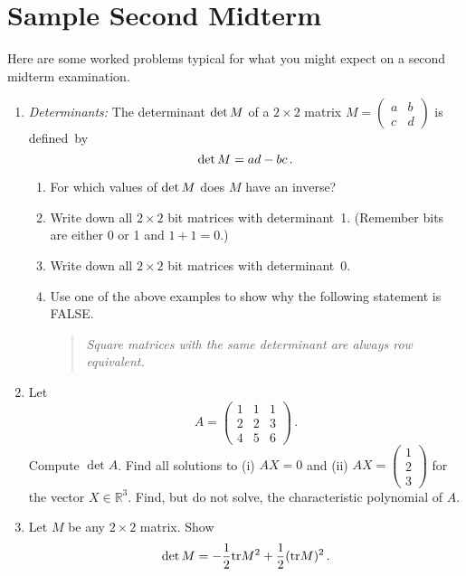 \chapter{Sample Second Midterm}

Here are some worked problems typical for what you might expect on a second midterm examination.
\label{sample2}

\begin{enumerate}

\item
{\it Determinants:} The determinant ${\rm det}\, M$ of a $2\times 2$ matrix $M=\begin{pmatrix}a&b\\c&d\end{pmatrix}$ is defined~by
\[
{\rm det}\,  M =ad -bc\, .
\] 
\begin{enumerate}
\item For which values of ${\rm det}\,  M$ does $M$ have an inverse?
\item Write down all $2\times 2$ bit matrices with determinant~1. (Remember bits are either 0 or 1 and $1+1=0$.)
\item Write down all $2\times 2$ bit matrices with determinant~0.
\item Use one of the above examples to show why the following statement is FALSE.
\begin{quote}
{\it Square matrices with the same determinant are always row equivalent.}
\end{quote}
\end{enumerate}



\item
Let 
\[
A=\left(\begin{array}{ccc}1&1&1\\[2mm]2&2&3\\[2mm]4&5&6\end{array}\right)\, .
\]
Compute $\det A$.
Find all solutions to (i) $A X =  0$ and (ii) $A X=\left(
\begin{array}{c}1\\2\\3\end{array}\right)$ for the vector $X\in \mathbb R^3$. Find, but do not solve,
the characteristic polynomial of $A$.

\item
Let $M$ be any $2\times 2$ matrix. Show
\[
\det M = -\frac 12 {\rm tr} M^2 + \frac 12 ({\rm tr} M)^2\, .
\]


\end{enumerate}
